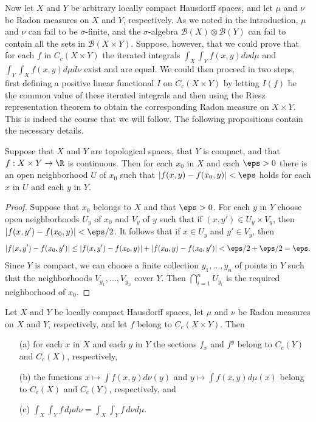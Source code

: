 Now let $X$ and $Y$ be arbitrary locally compact Hausdorff spaces, and let $\mu$ and $\nu$ be Radon measures on $X$ and $Y$, respectively. As we noted in the introduction, $\mu$ and $\nu$ can fail to be $\sigma$-finite, and the $\sigma$-algebra $\mathcal{B}(X)\otimes\mathcal{B}(Y)$ can fail to contain all the sets in $\mathcal{B}(X\times Y)$. Suppose, however, that we could prove that for each $f$ in $C_c(X\times Y)$ the iterated integrals $\int_X\int_Yf(x,y)d\nu d\mu$ and $\int_Y\int_Xf(x,y)d\mu d\nu$ exist and are equal. We could then proceed in two steps, first defining a positive linear functional $I$ on $C_c(X\times Y)$ by letting $I(f)$ be the common value of these iterated integrals and then using the Riesz representation theorem to obtain the corresponding Radon measure on $X\times Y$. This is indeed the course that we will follow. The following propositions contain the necessary details.
\begin{lemma}\label{product continuous uniform on compact}
Suppose that $X$ and $Y$ are topological spaces, that $Y$ is compact, and that $f:X\times Y\to\R$ is continuous. Then for each $x_0$ in $X$ and each $\eps>0$ there is an open neighborhood $U$ of $x_0$ such that $|f(x,y)-f(x_0,y)|<\eps$ holds for each $x$ in $U$ and each $y$ in $Y$.
\end{lemma}
\begin{proof}
Suppose that $x_0$ belongs to $X$ and that $\eps>0$. For each $y$ in $Y$ choose open neighborhoods $U_y$ of $x_0$ and $V_y$ of $y$ such that if $(x,y')\in U_y\times V_y$, then $|f(x,y')-f(x_0,y)|<\eps/2$. It follows that if $x\in U_y$ and $y'\in V_y$, then
\[|f(x,y')-f(x_0,y')|\leq|f(x,y')-f(x_0,y)|+|f(x_0,y)-f(x_0,y')|<\eps/2+\eps/2=\eps.\]
Since $Y$ is compact, we can choose a finite collection $y_1,\dots,y_n$ of points in $Y$ such that the neighborhoods $V_{y_1},\dots,V_{y_n}$ cover $Y$. Then $\bigcap_{i=1}^{n}U_{y_i}$ is the required neighborhood of $x_0$.
\end{proof}
\begin{proposition}\label{LCH double integral}
Let $X$ and $Y$ be locally compact Hausdorff spaces, let $\mu$ and $\nu$ be Radon measures on $X$ and $Y$, respectively, and let $f$ belong to $C_c(X\times Y)$. Then
\begin{itemize}
\item[(a)] for each $x$ in $X$ and each $y$ in $Y$ the sections $f_x$ and $f^y$ belong to $C_c(Y)$ and $C_c(X)$, respectively,
\item[(b)] the functions $x\mapsto\int f(x,y)d\nu(y)$ and $y\mapsto\int f(x,y)d\mu(x)$ belong to $C_c(X)$ and $C_c(Y)$, respectively, and 
\item[(c)] $\int_X\int_Yf\,d\mu d\nu=\int_X\int_Yf\,d\nu d\mu$.
\end{itemize}
\end{proposition}
